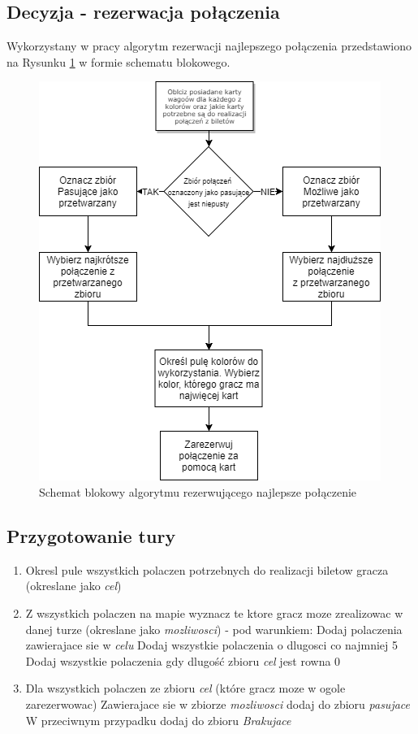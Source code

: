 \documentclass[12pt, oneside]{report}
\begin{document}
	\subsection{Decyzja - rezerwacja połączenia}
	Wykorzystany w pracy algorytm rezerwacji najlepszego połączenia przedstawiono na Rysunku \ref{figure:connection_diagram} w formie schematu blokowego.
	\begin{figure}[h]
		\centering
		\includegraphics[height=0.6\textheight]{ConnectionClaim.png}
		\caption{Schemat blokowy algorytmu rezerwującego najlepsze połączenie}
		\label{figure:connection_diagram}
	\end{figure}
	
	\subsection{Przygotowanie tury}
	\begin{enumerate}
		\item Okresl pule wszystkich polaczen potrzebnych do realizacji biletow gracza (okreslane jako \textit{cel})
		\item Z wszystkich polaczen na mapie wyznacz te ktore gracz moze zrealizowac w danej turze (okreslane jako \textit{mozliwosci}) - pod warunkiem:
		\subitem Dodaj polaczenia zawierajace sie w \textit{celu}
		\subitem Dodaj wszystkie polaczenia o dlugosci co najmniej 5
		\subitem Dodaj wszystkie polaczenia gdy dlugość zbioru \textit{cel} jest rowna 0
		\item Dla wszystkich polaczen ze zbioru \textit{cel} (które gracz moze w ogole zarezerwowac)
		\subitem Zawierajace sie w zbiorze \textit{mozliwosci} dodaj do zbioru \textit{pasujace}
		\subitem W przeciwnym przypadku dodaj do zbioru \textit{Brakujace}
		
	\end{enumerate}
\end{document}
